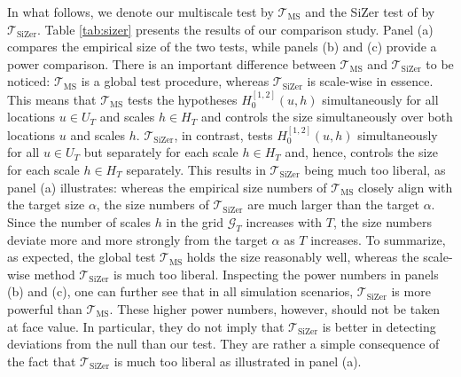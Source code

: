 \documentclass[12pt]{article}
\begin{document}
In what follows, we denote our multiscale test by $\mathcal{T}_{\text{MS}}$ and the SiZer test of \cite{Park2009} by $\mathcal{T}_{\text{SiZer}}$. Table \ref{tab:sizer} presents the results of our comparison study. Panel (a) compares the empirical size of the two tests, while panels (b) and (c) provide a power comparison. 
There is an important difference between $\mathcal{T}_{\text{MS}}$ and $\mathcal{T}_{\text{SiZer}}$ to be noticed: $\mathcal{T}_{\text{MS}}$ is a global test procedure, whereas $\mathcal{T}_{\text{SiZer}}$ is scale-wise in essence. This means that $\mathcal{T}_{\text{MS}}$ tests the hypotheses $H_0^{[1,2]}(u,h)$ simultaneously for all locations $u \in U_T$ and scales $h \in H_T$ and controls the size simultaneously over both locations $u$ and scales $h$. $\mathcal{T}_{\text{SiZer}}$, in contrast, tests $H_0^{[1,2]}(u,h)$ simultaneously for all $u \in U_T$ but separately for each scale $h \in H_T$ and, hence, controls the size for each scale $h \in H_T$ separately. This results in $\mathcal{T}_{\text{SiZer}}$ being much too liberal, as panel (a) illustrates: whereas the empirical size numbers of $\mathcal{T}_{\text{MS}}$ closely align with the target size $\alpha$, the size numbers of $\mathcal{T}_{\text{SiZer}}$ are much larger than the target $\alpha$. Since the number of scales $h$ in the grid $\mathcal{G}_T$ increases with $T$, the size numbers deviate more and more strongly from the target $\alpha$ as $T$ increases. To summarize, as expected, the global test $\mathcal{T}_{\text{MS}}$ holds the size reasonably well, whereas the scale-wise method $\mathcal{T}_{\text{SiZer}}$ is much too liberal.
Inspecting the power numbers in panels (b) and (c), one can further see that in all simulation scenarios, $\mathcal{T}_{\text{SiZer}}$ is more powerful than $\mathcal{T}_{\text{MS}}$. These higher power numbers, however, should not be taken at face value. In particular, they do not imply that $\mathcal{T}_{\text{SiZer}}$ is better in detecting deviations from the null than our test. They are rather a simple consequence of the fact that $\mathcal{T}_{\text{SiZer}}$ is much too liberal as illustrated in panel (a).
\end{document}
